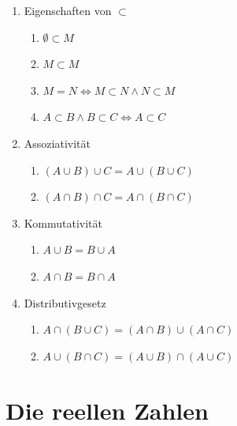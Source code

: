 \documentclass[12pt,a4paper,titlepage]{article} %
\theoremstyle{definition}
\theoremstyle{remark}
\begin{document}
\begin{enumerate}
	\item Eigenschaften von \glqq $\subset$\grqq
	\begin{enumerate}
		\item $\emptyset \subset M$
		\item $M\subset M$
		\item $M=N \Leftrightarrow M\subset N \wedge N\subset M$
		\item $A\subset B \wedge B \subset C \Leftrightarrow A \subset C$
	\end{enumerate}
	\item Assoziativität
	\begin{enumerate}
		\item $(A\cup B) \cup C = A \cup (B \cup C)$
		\item $(A\cap B) \cap C = A \cap (B \cap C)$
	\end{enumerate}
	\item Kommutativität
	\begin{enumerate}
		\item $A\cup B = B \cup A$
		\item $A\cap B = B \cap A$
	\end{enumerate}
	\item Distributivgesetz
	\begin{enumerate}
		\item $A \cap (B\cup C) = (A\cap B) \cup (A\cap C)$
		\item $A \cup (B\cap C) = (A\cup B) \cap (A\cup C)$
	\end{enumerate}
\end{enumerate}
\section{Die reellen Zahlen}
\end{document}
